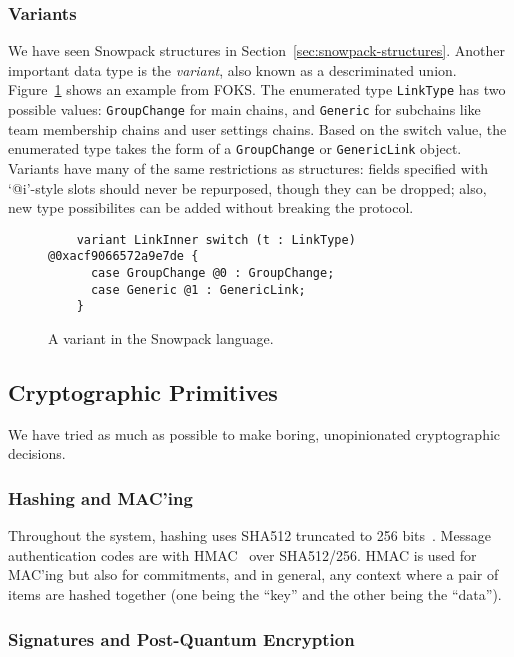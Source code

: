 \subsubsection{Variants}

We have seen Snowpack structures in Section~\ref{sec:snowpack-structures}. Another important
data type is the \textit{variant}, also known as a descriminated union. Figure~\ref{fig:link-inner}
shows an example from FOKS. The enumerated type \texttt{LinkType} has two possible values:
\texttt{GroupChange} for main chains, and \texttt{Generic} for subchains like team membership chains
and user settings chains. Based on the switch value, the enumerated type takes the form of 
a \texttt{GroupChange} or \texttt{GenericLink} object. Variants have many of the same restrictions
as structures: fields specified with `@i'-style slots should never be repurposed, though they 
can be dropped; also, new type possibilites can be added without breaking the protocol.

\begin{figure}[ht]
  \centering
  \begin{verbatim}
    variant LinkInner switch (t : LinkType) @0xacf9066572a9e7de {
      case GroupChange @0 : GroupChange;
      case Generic @1 : GenericLink;
    }\end{verbatim}
  \caption{A variant in the Snowpack language.}
  \label{fig:link-inner}
\end{figure}

\subsection{Cryptographic Primitives}
\label{sec:cryptography}

We have tried as much as possible to make boring, unopinionated cryptographic
decisions.

\subsubsection{Hashing and MAC'ing}

Throughout the system, hashing uses SHA512 truncated to 256
bits~\cite{rfc6234}. Message authentication codes are with HMAC~\cite{rfc2104}
over SHA512/256. HMAC is used for MAC'ing but also for commitments, and in 
general, any context where a pair of items are hashed together (one being the ``key''
and the other being the ``data'').

\subsubsection{Signatures and Post-Quantum Encryption}

